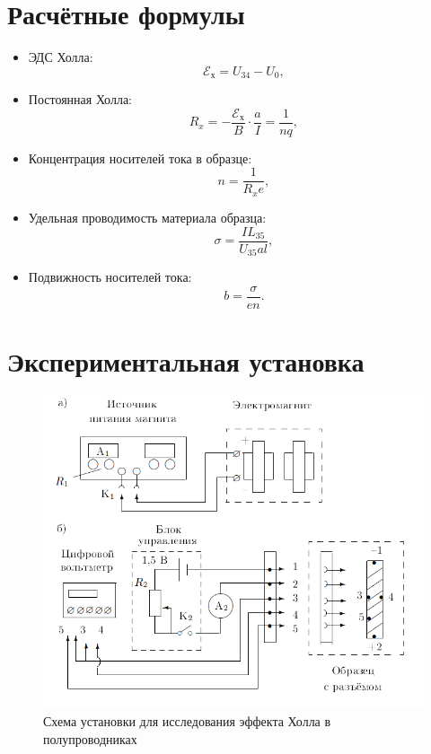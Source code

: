 \documentclass[a4paper, 12pt]{article}
\begin{document}
\section{Расчётные формулы}

\begin{itemize}
\item ЭДС Холла:
\begin{equation} \label{E}
\mathscr{E_\text{х}} = U_{34} - U_0,
\end{equation}
\item Постоянная Холла:
\begin{equation} \label{R_x}
R_x = -\frac{\mathscr{E_\text{х}}}{B}\cdot\frac{a}{I} = \frac{1}{nq},
\end{equation}
\item Концентрация носителей тока в образце:
\begin{equation} \label{n}
n = \frac{1}{R_xe},
\end{equation}
\item Удельная проводимость материала образца:
\begin{equation}
\sigma = \frac{IL_{35}}{U_{35}al},
\end{equation}
\item Подвижность носителей тока:
\begin{equation}
b = \frac{\sigma}{en}.
\end{equation}
\end{itemize}

\section{Экспериментальная установка}

\begin{figure}[h]
\begin{center}
\includegraphics[width=1\textwidth]{Рисунок_установки}
\end{center}
\caption{Схема установки для исследования эффекта Холла в полупроводниках}
\end{figure}
\end{document}
